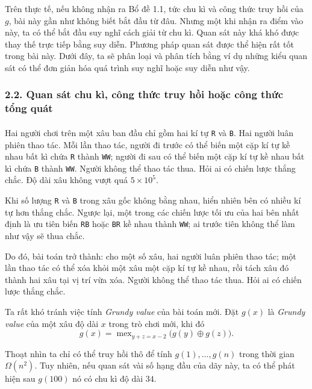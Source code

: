 \documentclass[11pt]{article}
\begin{document}
Trên thực tế, nếu không nhận ra Bổ đề 1.1, tức chu kì và công thức truy hồi
của \(g\), bài này gần như không biết bắt đầu từ đâu. Nhưng một khi nhận ra
điểm vào này, ta có thể bắt đầu suy nghĩ cách giải từ chu kì. Quan sát này
khá khó được thay thế trực tiếp bằng suy diễn. Phương pháp quan sát được thể
hiện rất tốt trong bài này. Dưới đây, ta sẽ phân loại và phân tích bằng ví dụ
những kiểu quan sát có thể đơn giản hóa quá trình suy nghĩ hoặc suy diễn như
vậy.

\subsubsection*{2.2. Quan sát chu kì, công thức truy hồi hoặc công thức tổng quát}

\paragraph{}
Hai người chơi trên một xâu ban đầu chỉ gồm hai kí tự \texttt{R} và
\texttt{B}. Hai người luân phiên thao tác. Mỗi lần thao tác, người đi trước có
thể biến một cặp kí tự kề nhau bất kì chứa \texttt{R} thành \texttt{WW}; người
đi sau có thể biến một cặp kí tự kề nhau bất kì chứa \texttt{B} thành
\texttt{WW}. Người không thể thao tác thua. Hỏi ai có chiến lược thắng chắc.
Độ dài xâu không vượt quá \(5\times 10^5\).

Khi số lượng \texttt{R} và \texttt{B} trong xâu gốc không bằng nhau, hiển nhiên
bên có nhiều kí tự hơn thắng chắc. Ngược lại, một trong các chiến lược tối ưu
của hai bên nhất định là ưu tiên biến \texttt{RB} hoặc \texttt{BR} kề nhau
thành \texttt{WW}; ai trước tiên không thể làm như vậy sẽ thua chắc.

Do đó, bài toán trở thành: cho một số xâu, hai người luân phiên thao tác; một
lần thao tác có thể xóa khỏi một xâu một cặp kí tự kề nhau, rồi tách xâu đó
thành hai xâu tại vị trí vừa xóa. Người không thể thao tác thua. Hỏi ai có
chiến lược thắng chắc.

Ta rất khó tránh việc tính \emph{Grundy value} của bài toán mới. Đặt \(g(x)\)
là \emph{Grundy value} của một xâu độ dài \(x\) trong trò chơi mới, khi đó
\[
  g(x)=\operatorname{mex}_{y+z=x-2}\bigl(g(y)\oplus g(z)\bigr).
\]

Thoạt nhìn ta chỉ có thể truy hồi thô để tính \(g(1),\ldots,g(n)\) trong thời
gian \(\Omega(n^2)\). Tuy nhiên, nếu quan sát vài số hạng đầu của dãy này, ta
có thể phát hiện sau \(g(100)\) nó có chu kì độ dài \(34\).
\end{document}
